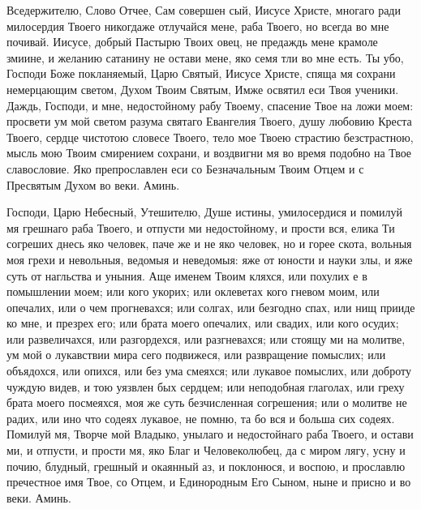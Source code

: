 \begin{mymulticols}

Вседержителю, Слово Отчее, Сам совершен сый, Иисусе Христе, многаго ради милосердия Твоего никогдаже отлучайся мене, раба Твоего, но всегда во мне почивай. Иисусе, добрый Пастырю Твоих овец, не предаждь мене крамоле змиине, и желанию сатанину не остави мене, яко семя тли во мне есть. Ты убо, Господи Боже покланяемый, Царю Святый, Иисусе Христе, спяща мя сохрани немерцающим светом, Духом Твоим Святым, Имже освятил еси Твоя ученики. Даждь, Господи, и мне, недостойному рабу Твоему, спасение Твое на ложи моем: просвети ум мой светом разума святаго Евангелия Твоего, душу любовию Креста Твоего, сердце чистотою словесе Твоего, тело мое Твоею страстию безстрастною, мысль мою Твоим смирением сохрани, и воздвигни мя во время подобно на Твое славословие. Яко препрославлен еси со Безначальным Твоим Отцем и с Пресвятым Духом во веки. Аминь.


Господи, Царю Небесный, Утешителю, Душе истины, умилосердися и помилуй мя грешнаго раба Твоего, и отпусти ми недостойному, и прости вся, елика Ти согреших днесь яко человек, паче же и не яко человек, но и горее скота, вольныя моя грехи и невольныя, ведомыя и неведомыя: яже от юности и науки злы, и яже суть от нагльства и уныния. Аще именем Твоим кляхся, или похулих е в помышлении моем; или кого укорих; или оклеветах кого гневом моим, или опечалих, или о чем прогневахся; или солгах, или безгодно спах, или нищ прииде ко мне, и презрех его; или брата моего опечалих, или свадих, или кого осудих; или развеличахся, или разгордехся, или разгневахся; или стоящу ми на молитве, ум мой о лукавствии мира сего подвижеся, или развращение помыслих; или объядохся, или опихся, или без ума смеяхся; или лукавое помыслих, или доброту чуждую видев, и тою уязвлен бых сердцем; или неподобная глаголах, или греху брата моего посмеяхся, моя же суть безчисленная согрешения; или о молитве не радих, или ино что содеях лукавое, не помню, та бо вся и больша сих содеях. Помилуй мя, Творче мой Владыко, унылаго и недостойнаго раба Твоего, и остави ми, и отпусти, и прости мя, яко Благ и Человеколюбец, да с миром лягу, усну и почию, блудный, грешный и окаянный аз, и поклонюся, и воспою, и прославлю пречестное имя Твое, со Отцем, и Единородным Его Сыном, ныне и присно и во веки. Аминь.



\end{mymulticols}
